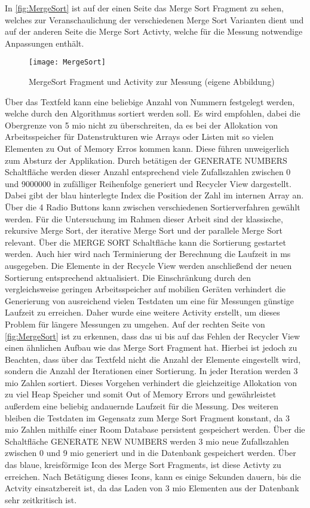 In \autoref{fig:MergeSort} ist auf der einen Seite das Merge Sort Fragment zu sehen, welches zur Veranschaulichung der verschiedenen Merge Sort Varianten dient und auf der anderen Seite die Merge Sort Activty, welche für die Messung notwendige Anpassungen enthält. 
\begin{figure}[H]
\begin{center}
	\texttt{[image: MergeSort]}
	\caption{MergeSort Fragment und Activity zur Messung (eigene Abbildung)}
	\label{fig:MergeSort} 
\end{center}
\end{figure}
Über das Textfeld kann eine beliebige Anzahl von Nummern festgelegt werden, welche durch den Algorithmus sortiert werden soll. Es wird empfohlen, dabei die Obergrenze von 5 \ac{mio} nicht zu überschreiten, da es bei der Allokation von Arbeitsspeicher für Datenstrukturen wie Arrays oder Listen mit so vielen Elementen zu Out of Memory Erros kommen kann. Diese führen unweigerlich zum Absturz der Applikation. Durch betätigen der \glqq GENERATE NUMBERS\grqq{} Schaltfläche werden dieser Anzahl entsprechend viele Zufallszahlen zwischen 0 und 9000000 in zufälliger Reihenfolge generiert und Recycler View dargestellt. Dabei gibt der blau hinterlegte Index die Position der Zahl im internen Array an. Über die 4 Radio Buttons kann zwischen verschiedenen Sortierverfahren gewählt werden. Für die Untersuchung im Rahmen dieser Arbeit sind der klassische, rekursive Merge Sort, der iterative Merge Sort und der parallele Merge Sort relevant. Über die \glqq MERGE SORT\grqq{} Schaltfläche kann die Sortierung gestartet werden. Auch hier wird nach Terminierung der Berechnung die Laufzeit in \ac{ms} ausgegeben. Die Elemente in der Recycle View werden anschließend der neuen Sortierung entsprechend aktualisiert. Die Einschränkung durch den vergleichsweise geringen Arbeitsspeicher auf mobilien Geräten verhindert die Generierung von ausreichend vielen Testdaten um eine für Messungen günstige Laufzeit zu erreichen. Daher wurde eine weitere Activity erstellt, um dieses Problem für längere Messungen zu umgehen. Auf der rechten Seite von \autoref{fig:MergeSort} ist zu erkennen, dass das \ac{ui} bis auf das Fehlen der Recycler View einen ähnlichen Aufbau wie das Merge Sort Fragment hat. Hierbei ist jedoch zu Beachten, dass über das Textfeld nicht die Anzahl der Elemente eingestellt wird, sondern die Anzahl der Iterationen einer Sortierung. In jeder Iteration werden 3 \ac{mio} Zahlen sortiert. Dieses Vorgehen verhindert die gleichzeitige Allokation von zu viel Heap Speicher und somit Out of Memory Errors und gewährleistet außerdem eine beliebig andauernde Laufzeit für die Messung. Des weiteren bleiben die Testdaten im Gegensatz zum Merge Sort Fragment konstant, da 3 \ac{mio} Zahlen mithilfe einer Room Database persistent gespeichert werden. Über die Schaltfläche \glqq GENERATE NEW NUMBERS\grqq{} werden 3 \ac{mio} neue Zufallszahlen zwischen 0 und 9 \ac{mio} generiert und in die Datenbank gespeichert werden. Über das blaue, kreisförmige Icon des Merge Sort Fragments, ist diese Activty zu erreichen. Nach Betätigung dieses Icons, kann es einige Sekunden dauern, bis die Actvity einsatzbereit ist, da das Laden von 3 \ac{mio} Elementen aus der Datenbank sehr zeitkritisch ist.
